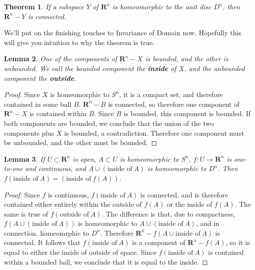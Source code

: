 \documentclass[12pt]{report}
\theoremstyle{plain}
\newtheorem{theorem}{Theorem}[chapter]
\newtheorem{lemma}[theorem]{Lemma}
\theoremstyle{definition}
\begin{document}
\begin{theorem}
    If a subspace $Y$ of $\mathbf{R}^n$ is homeomorphic to the unit disc $D^n$, then $\mathbf{R}^n - Y$ is connected.
\end{theorem}

We'll put on the finishing touches to Invariance of Domain now. Hopefully this will give you intuition to why the theorem is true.

\begin{lemma}
    One of the components of $\mathbf{R}^n - X$ is bounded, and the other is unbounded. We call the bounded component the {\bf inside} of $X$, and the unbounded component the {\bf outside}.
\end{lemma}
\begin{proof}
    Since $X$ is homeomorphic to $S^n$, it is a compact set, and therefore contained in some ball $B$. $\mathbf{R}^n - B$ is connected, so therefore one component of $\mathbf{R}^n - X$ is contained within $B$. Since $B$ is bounded, this component is bounded. If both components are bounded, we conclude that the union of the two components plus $X$ is bounded, a contradiction. Therefore one component must be unbounded, and the other must be bounded.
\end{proof}

\begin{lemma}
    If $U \subset \mathbf{R}^n$ is open, $A \subset U$ is homeomorphic to $S^n$, $f:U \to \mathbf{R}^n$ is one-to-one and continuous, and $A \cup (\text{inside of}\ A)$ is homeomorphic to $D^n$. Then $f(\text{inside of}\ A) = (\text{inside of}\ f(A))$.
\end{lemma}
\begin{proof}
    Since $f$ is continuous, $f(\text{inside of}\ A)$ is connected, and is therefore contained either entirely within the outside of $f(A)$ or the inside of $f(A)$. The same is true of $f(\text{outside of}\ A)$. The difference is that, due to compactness, $f(A \cup (\text{inside of}\ A))$ is homeomorphic to $A \cup (\text{inside of}\ A)$, and in connection, homeomrphic to $D^n$. Therefore $\mathbf{R}^n - f(A \cup \text{inside of}\ A)$ is connected. It follows that $f(\text{inside of}\ A)$ is a component of $\mathbf{R}^n - f(A)$, so it is equal to either the inside of outside of space. Since $f(\text{inside of}\ A)$ is contained within a bounded ball, we conclude that it is equal to the inside.
\end{proof}
\end{document}
